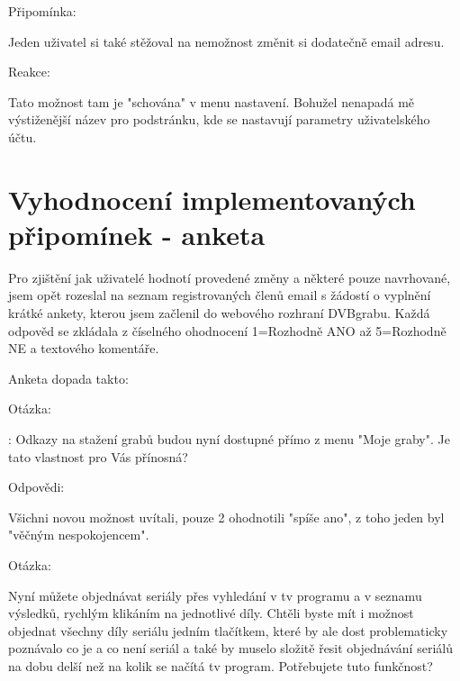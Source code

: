 \vspace{10pt}

\begin{bf}Připomínka:\end{bf} Jeden uživatel si také stěžoval na nemožnost změnit si dodatečně email adresu.

\begin{bf}Reakce:\end{bf} Tato možnost tam je "schována" v menu nastavení. Bohužel nenapadá mě výstiženější název pro podstránku, kde se nastavují parametry uživatelského účtu.

\vspace{10pt}

\section{Vyhodnocení implementovaných připomínek - anketa}

Pro zjištění jak uživatelé hodnotí provedené změny a některé pouze navrhované, jsem opět rozeslal na seznam registrovaných členů email s žádostí o vyplnění krátké ankety, kterou jsem začlenil do webového rozhraní DVBgrabu. Každá odpověd se zkládala z číselného ohodnocení 1=Rozhodně ANO až 5=Rozhodně NE a textového komentáře.

\vspace{10pt}

Anketa dopada takto:

\vspace{10pt}

\begin{bf}Otázka:\end{bf}: Odkazy na stažení grabů budou nyní dostupné přímo z menu "Moje graby". Je tato vlastnost pro Vás přínosná?

\begin{bf}Odpovědi:\end{bf} Všichni novou možnost uvítali, pouze 2 ohodnotili "spíše ano", z toho jeden byl "věčným nespokojencem".

\vspace{10pt}

\begin{bf}Otázka:\end{bf} Nyní můžete objednávat seriály přes vyhledání v tv programu a v seznamu výsledků, rychlým klikáním na jednotlivé díly. Chtěli byste mít i možnost objednat všechny díly seriálu jedním tlačítkem, které by ale dost problematicky poznávalo co je a co není seriál a také by muselo složitě řesit objednávání seriálů na dobu delší než na kolik se načítá tv program. Potřebujete tuto funkčnost?

